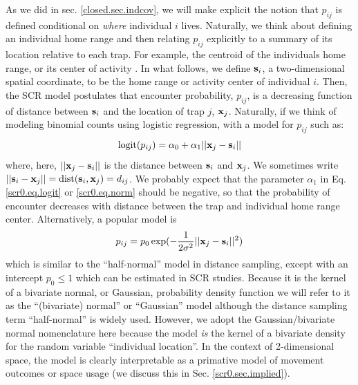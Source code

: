 As we did in sec. \ref{closed.sec.indcov}, we will make explicit the
notion that $p_{ij}$ is defined conditional on {\it where} individual
$i$ lives. Naturally, we think about defining an individual home range
and then relating $p_{ij}$ explicitly to a summary of its location
relative to each trap. For example, the centroid of the
individuals home range, or its center of activity \citep{efford:2004,
  borchers_efford:2008, royle_young:2008}.  In what follows, we define ${\bf
  s}_{i}$, a two-dimensional spatial coordinate, to be the home range
or activity center of individual $i$. Then, the SCR model postulates
that encounter probability, $p_{ij}$, is a decreasing function of
distance between ${\bf s}_{i}$ and the location of trap $j$, ${\bf
  x}_{j}$.  Naturally, if we think of modeling binomial counts using
logistic regression, with a model for $p_{ij}$ such as:
\begin{equation}
	\mbox{logit}(p_{ij}) = \alpha_{0} + \alpha_1 ||{\bf x}_{j}-{\bf s}_{i} ||
\label{scr0.eq.logit}
\end{equation}
where, here, $||{\bf x}_{j}-{\bf s}_{i}||$ is the distance between
${\bf s}_{i}$ and ${\bf x}_{j}$. We sometimes write $||{\bf
  s}_{i}-{\bf x}_{j}|| = \mbox{dist}({\bf s}_{i},{\bf x}_{j}) =
d_{ij}$.  We probably expect that the parameter $\alpha_{1}$ in
Eq. \ref{scr0.eq.logit} or \ref{scr0.eq.norm} should be negative, so
that the probability of encounter decreases with distance between the
trap and individual home range center.  Alternatively, a popular model
is
\begin{equation}
p_{ij} = p_{0}\exp(-\frac{1}{2\sigma^{2}}||{\bf x}_{j}-{\bf s}_{i}||^2)
\label{scr0.eq.norm}
\end{equation}
which is similar to the ``half-normal'' model in distance sampling,
except with an intercept $p_{0} \le 1$ which can be estimated in SCR
studies.  Because it is the kernel of a bivariate normal, or Gaussian,
probability density function we will refer to it as the ``(bivariate)
normal'' or ``Gaussian'' model although the distance sampling term
``half-normal'' is widely used.  However, we adopt the
Gaussian/bivariate normal nomenclature here because the model {\it is}
the kernel of a bivariate density for the random variable ``individual
location''.  In the context of 2-dimensional space, the model is
clearly interpretable as a primative model of movement outcomes or
space usage (we discuss this in Sec. \ref{scr0.sec.implied}).


